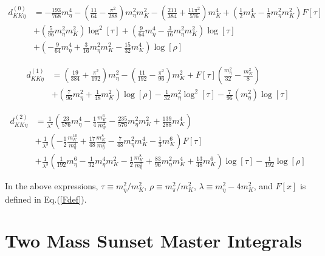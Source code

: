 \documentclass[12pt,a4paper]{article}
\begin{document}
\begin{align}
	{d}_{K K \eta}^{(0)} &= -\frac{193}{768} m_{\eta}^4 - \left(\frac{11}{64}-\frac{\pi ^2}{288}\right) m_{\eta}^2 m_{K}^2-\left(\frac{211}{384}+\frac{11 \pi ^2}{576}\right) m_{K}^4 + \left( \frac{1}{2} m_{K}^4 - \frac{1}{8} m_{\eta}^2 m_{K}^2 \right) F[\tau]	\nonumber \\
	& + \left( \frac{5}{96} m_{\eta}^2 m_{K}^2 \right) \log^2[\tau] + \left(\frac{9}{64} m_{\eta}^4 - \frac{3}{16} m_{\eta}^2 m_{K}^2 \right) \log[\tau]
 \nonumber \\	&
 + \left(-\frac{9}{64} m_{\eta}^4 + \frac{3}{16} m_{\eta}^2 m_{K}^2 - \frac{15}{32} m_{K}^4 \right) \log [\rho]
	\end{align}

\begin{align}
	{d}_{K K \eta}^{(1)} &= \left(\frac{19}{384}+\frac{\pi^2}{192}\right) m_{\eta}^2-\left(\frac{11}{192}-\frac{\pi^2}{96}\right) m_{K}^2 + F[\tau] \left(\frac{m_{\eta}^2}{32}-\frac{m_{K}^2}{8}\right)
 \nonumber \\	&
 + \left(\frac{7}{96} m_{\eta}^2 + \frac{1}{48} m_{K}^2 \right) \log[\rho]
 - \frac{1}{32} m_{\eta}^2 \log^2[\tau] - \frac{7}{96} \left(m_{\eta}^2\right) \log[\tau]
\end{align}

\begin{align}
	{d}_{K K \eta}^{(2)} &= \frac{1}{\lambda^2} \left( \frac{23}{576} m_{\eta}^4 - \frac{1}{4} \frac{m_{K}^6}{m_{\eta}^2} - \frac{235}{576} m_{\eta}^2 m_{K}^2 + \frac{139}{288} m_{K}^4 \right) \nonumber \\
	& + \frac{1}{\lambda^3} \left(- \frac{1}{2} \frac{m_{K}^{10}}{m_{\eta}^4} + \frac{17}{48} \frac{m_{K}^8}{m_{\eta}^2} - \frac{7}{48} m_{\eta}^2 m_{K}^4 - \frac{1}{3} m_{K}^6 \right) F[\tau] \nonumber \\
	& + \frac{1}{\lambda^3} \left(\frac{1}{192} m_{\eta}^6 - \frac{1}{32} m_{\eta}^4 m_{K}^2 - \frac{1}{2} \frac{m_{K}^8}{m_{\eta}^2} + \frac{83}{96} m_{\eta}^2 m_{K}^4 + \frac{13}{48} m_{K}^6 \right) \log [\tau] - \frac{1}{192} \log [\rho] 
\end{align}

In the above expressions, $\tau \equiv m_{\eta}^2/m_{K}^2$, $\rho \equiv m_{\pi}^2/m_{K}^2$, $\lambda \equiv m_{\eta}^2 - 4 m_K^2$, and $F[x]$ is defined in Eq.(\ref{Fdef}). 	


\section{Two Mass Sunset Master Integrals \label{SecMI}}
\end{document}

